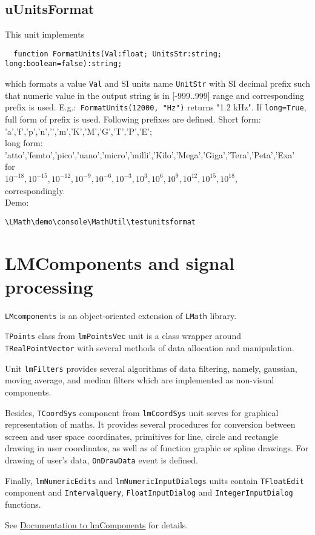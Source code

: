 \documentclass[12pt,a4paper,oneside]{article}
\newcommand{\code}[1]{\texttt{#1}}
\begin{document}
\subsection{uUnitsFormat}
This unit implements 
\begin{verbatim}
  function FormatUnits(Val:float; UnitsStr:string; long:boolean=false):string;
\end{verbatim}
which formats a value \code{Val} and SI units name \code{UnitStr} with SI decimal prefix such that numeric value in the output string is in [-999..999] range and corresponding prefix is used. E.g.:\code{ FormatUnits(12000, "Hz")} returns "1.2 kHz". If \code{long=True}, full form of prefix is used.
Following prefixes are defined. Short form:\\
'a','f','p','n','\micro','m','K','M','G','T','P','E';\\
long form:\\
'atto','femto','pico','nano','micro','milli','Kilo','Mega','Giga','Tera','Peta','Exa'\\ for\\
$10^{-18},10^{-15},10^{-12},10^{-9},10^{-6},10^{-3},10^{3},10^{6},10^{9},10^{12},10^{15},10^{18}$,\\
correspondingly.\\
Demo:
\begin{verbatim}
\LMath\demo\console\MathUtil\testunitsformat
\end{verbatim}
\section{LMComponents and signal processing}
\code{LMcomponents} is an object-oriented extension of \code{LMath} library. 

\code{TPoints} class from \code{lmPointsVec} unit is a class wrapper around \code{TRealPointVector} with several methods of data allocation and manipulation. 

Unit \code{lmFilters} provides several algorithms of data filtering, namely, gaussian, moving average, and median filters which are implemented as non-visual components.

Besides, \code{TCoordSys} component from \code{lmCoordSys} unit serves for graphical representation of maths. It provides several procedures for conversion between screen and user space coordinates, primitives for line, circle and rectangle drawing in user coordinates, as well as of function graphic or spline drawings. For drawing of user's data, \code{OnDrawData} event is defined.
 
Finally, \code{lmNumericEdits} and \code{lmNumericInputDialogs} units contain \code{TFloatEdit} component and \code{Intervalquery}, \code{FloatInputDialog} and \code{IntegerInputDialog} functions.

See \href{file:LMComponents.pdf}{Documentation to lmComponents} for details.
\end{document}
